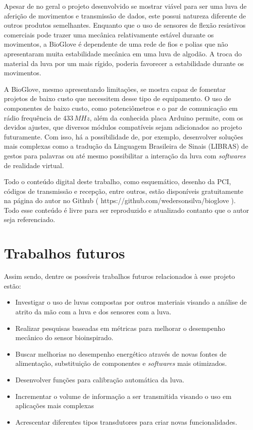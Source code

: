 \documentclass[
	12pt,				%
	openright,			%
	oneside,			%
	a4paper,			%
	english,			%
	brazil				%
	]{abntex2}
\begin{document}
		Apesar de no geral o projeto desenvolvido se mostrar viável para ser uma luva de aferição de movimentos e transmissão de dados, este possui natureza diferente de outros produtos semelhantes. Enquanto que o uso de sensores de flexão resistivos comerciais pode trazer uma mecânica relativamente estável durante os movimentos, a BioGlove é dependente de uma rede de fios e polias que não apresentaram muita estabilidade mecânica em uma luva de algodão. A troca do material da luva por um  mais rígido, poderia favorecer a estabilidade durante os movimentos.

		A BioGlove, mesmo apresentando limitações, se mostra capaz de fomentar projetos de baixo custo que necessitem desse tipo de equipamento. O uso de componentes de baixo custo, como potenciômetros e o par de comunicação em rádio frequência de 433$\,MHz$, além da conhecida placa Arduino permite, com os devidos ajustes, que diversos módulos compatíveis sejam adicionados ao projeto futuramente. Com isso, há a possibilidade de, por exemplo, desenvolver soluções mais complexas como a tradução da Linguagem Brasileira de Sinais (LIBRAS) de gestos para palavras ou até mesmo possibilitar a interação da luva com \textit{softwares} de realidade virtual. 
		
		Todo o conteúdo digital deste trabalho, como esquemático, desenho da PCI, códigos de transmissão e recepção, entre outros, estão disponíveis gratuitamente na página do autor no Github ( https://github.com/wedersonsilva/bioglove ). Todo esse conteúdo é livre para ser reproduzido e atualizado contanto que o autor seja referenciado.

			\section{Trabalhos futuros}		

		Assim sendo, dentre os possíveis trabalhos futuros relacionados à esse projeto estão:

		\begin{itemize}
			\item Investigar o uso de luvas compostas por outros materiais visando a análise de atrito da mão com a luva e dos sensores com a luva.
			\item Realizar pesquisas baseadas em métricas para melhorar o desempenho mecânico do sensor bioinspirado.
			\item Buscar melhorias no desempenho energético através de novas fontes de alimentação, substituição de componentes e \textit{softwares} mais otimizados.
			\item Desenvolver funções para calibração automática da luva.
			\item Incrementar o volume de informação a ser transmitida visando o uso em aplicações mais complexas
			\item Acrescentar diferentes tipos transdutores para criar novas funcionalidades.
		\end{itemize}
\end{document}
